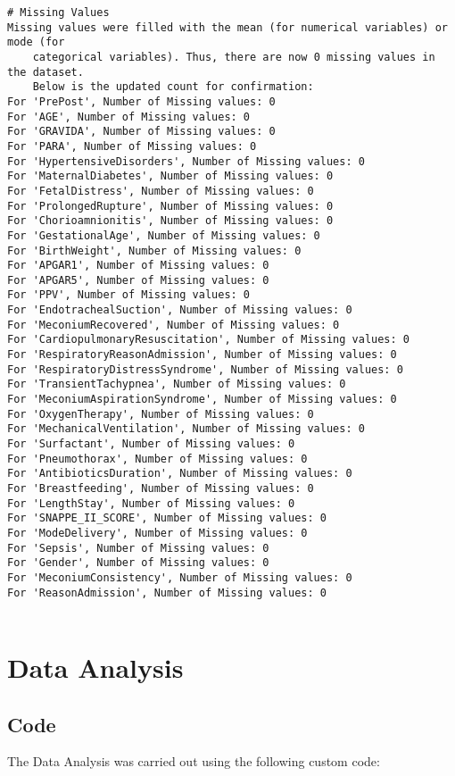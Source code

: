 \documentclass[11pt]{article}
\begin{document}
\begin{Verbatim}[tabsize=4]
# Missing Values
Missing values were filled with the mean (for numerical variables) or mode (for
	categorical variables). Thus, there are now 0 missing values in the dataset.
	Below is the updated count for confirmation:
For 'PrePost', Number of Missing values: 0
For 'AGE', Number of Missing values: 0
For 'GRAVIDA', Number of Missing values: 0
For 'PARA', Number of Missing values: 0
For 'HypertensiveDisorders', Number of Missing values: 0
For 'MaternalDiabetes', Number of Missing values: 0
For 'FetalDistress', Number of Missing values: 0
For 'ProlongedRupture', Number of Missing values: 0
For 'Chorioamnionitis', Number of Missing values: 0
For 'GestationalAge', Number of Missing values: 0
For 'BirthWeight', Number of Missing values: 0
For 'APGAR1', Number of Missing values: 0
For 'APGAR5', Number of Missing values: 0
For 'PPV', Number of Missing values: 0
For 'EndotrachealSuction', Number of Missing values: 0
For 'MeconiumRecovered', Number of Missing values: 0
For 'CardiopulmonaryResuscitation', Number of Missing values: 0
For 'RespiratoryReasonAdmission', Number of Missing values: 0
For 'RespiratoryDistressSyndrome', Number of Missing values: 0
For 'TransientTachypnea', Number of Missing values: 0
For 'MeconiumAspirationSyndrome', Number of Missing values: 0
For 'OxygenTherapy', Number of Missing values: 0
For 'MechanicalVentilation', Number of Missing values: 0
For 'Surfactant', Number of Missing values: 0
For 'Pneumothorax', Number of Missing values: 0
For 'AntibioticsDuration', Number of Missing values: 0
For 'Breastfeeding', Number of Missing values: 0
For 'LengthStay', Number of Missing values: 0
For 'SNAPPE_II_SCORE', Number of Missing values: 0
For 'ModeDelivery', Number of Missing values: 0
For 'Sepsis', Number of Missing values: 0
For 'Gender', Number of Missing values: 0
For 'MeconiumConsistency', Number of Missing values: 0
For 'ReasonAdmission', Number of Missing values: 0


\end{Verbatim}

\section{Data Analysis} \subsection{Code}The Data Analysis was carried out using the following custom code:
\end{document}

